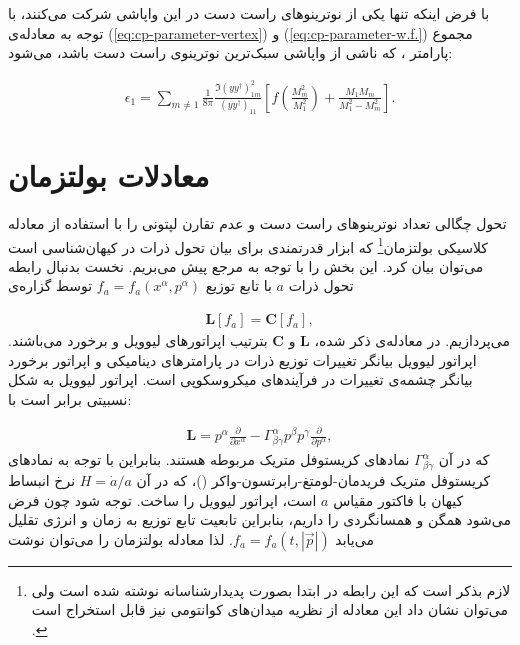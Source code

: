\documentclass[a4paper]{book}
\begin{document}
با فرض اینکه تنها یکی از نوترینو‌های راست دست در این واپاشی شرکت می‌کنند، با توجه به معادله‌ی (\ref{eq:cp-parameter-vertex}) و (\ref{eq:cp-parameter-w.f.}) مجموع پارامتر ، که ناشی از واپاشی سبک‌ترین نوترینوی راست دست باشد، می‌شود:
\par
\vspace{-0.5cm}
{\footnotesize\begin{align}
	\epsilon_1=\sum_{m\neq 1} \frac{1}{8 \pi} \frac{\Im\left(yy^{\dagger}\right)^2_{1m}}{\left(yy^{\dagger}\right)_{11}} \left[f(\frac{M_m^2}{M_1^2})+\frac{M_1 M_m}{M_1^2 - M_m^2}\right].
	\label{eq:cp-parameter-total}
\end{align}}

\section{معادلات بولتزمان}
\label{sec:Boltzmann}
تحول چگالی تعداد نوترینوهای راست دست و عدم تقارن لپتونی را با استفاده از معادله کلاسیکی بولتزمان\footnote{لازم بذکر است که این رابطه در ابتدا بصورت پدیدارشناسانه نوشته شده است ولی می‌توان نشان داد این معادله از نظریه میدان‌های کوانتومی نیز قابل استخراج است \cite{Drewes:2012qw}.} که ابزار قدرتمندی برای بیان تحول ذرات در کیهان‌شناسی است می‌توان بیان کرد. این بخش را با توجه به مرجع \cite{Kolb:1990vq} پیش می‌بریم. نخست بدنبال رابطه تحول ذرات {\footnotesize$a$} با تابع توزیع {\footnotesize$f_a=f_a(x^{\alpha},p^{\alpha})$} توسط گزاره‌ی
\par
\vspace{-0.5cm}
{\footnotesize\begin{align}
	\boldsymbol{L}[f_a]=\boldsymbol{C}[f_a],
\end{align}}
می‌پردازیم. در معادله‌ی ذکر شده، {\footnotesize$\boldsymbol{L}$} و {\footnotesize$\boldsymbol{C}$} بترتیب اپراتورهای لیوویل و برخورد می‌باشند. اپراتور لیوویل بیانگر تغییرات توزیع ذرات در پارامترهای دینامیکی و اپراتور برخورد بیانگر چشمه‌ی تغییرات در فرآیند‌های میکروسکوپی است.
اپراتور لیوویل به شکل نسبیتی برابر است با:
\par
\vspace{-0.5cm}
{\footnotesize\begin{align}
	\boldsymbol{L}=p^{\alpha}\frac{\partial}{\partial x^{\alpha}}-\Gamma^{\alpha}_{\beta \gamma} p^{\beta} p^{\gamma} \frac{\partial}{\partial p^{\alpha}},
	\label{eq:liouville}
\end{align}}
که در آن {\footnotesize$\Gamma^{\alpha}_{\beta \gamma}$} نمادهای کریستوفل متریک مربوطه هستند.
بنابراین با توجه به نمادهای کریستوفل متریک فریدمان-لومتغ-رابرتسون-واکر ()، که در آن {\footnotesize$H=\dot{a}/a$}  نرخ انبساط کیهان با فاکتور مقیاس {\footnotesize$a$} است، اپراتور لیوویل را ساخت. توجه شود چون فرض می‌شود همگن و همسانگردی را داریم، بنابراین تابعیت تابع توزیع به زمان و انرژی تقلیل می‌یابد {\footnotesize$f_a=f_a(t,|\vec{p}|)$}. لذا معادله بولتزمان را می‌توان نوشت \cite{Kolb:1990vq}
\end{document}
